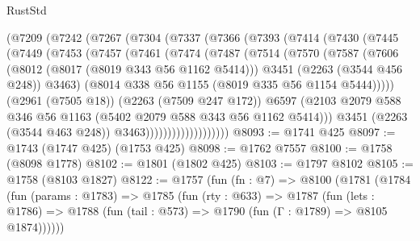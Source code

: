 \begin{lexlean}{RustStd}
\begin{coremodule}
{\begin{coremodule}
{{{{{{{{{{{{{{{            (@7209
              (@7242
                (@7267
                  (@7304
                    (@7337
                      (@7366
                        (@7393
                          (@7414
                            (@7430
                              (@7445
                                (@7449
                                  (@7453
                                    (@7457
                                      (@7461
                                        (@7474
                                          (@7487
                                            (@7514
                                              (@7570
                                                (@7587
                                                  (@7606
                                                    (@8012 (@8017 (@8019 @343 @56 @1162 @5414)))
                                                    @3451
                                                    (@2263 (@3544 @456 @248))
                                                    @3463)
                                                  (@8014
                                                    @338
                                                    @56
                                                    @1155
                                                    (@8019 @335 @56 @1154 @5444)))))
                                            (@2961 (@7505 @18))
                                            (@2263 (@7509 @247 @172))
                                            @6597
                                            (@2103
                                              @2079
                                              @588
                                              @346
                                              @56
                                              @1163
                                              (@5402 @2079 @588 @343 @56 @1162 @5414)))
                                          @3451
                                          (@2263 (@3544 @463 @248))
                                          @3463)))))))))))))))))))
@8093 := @1741 @425
@8097 := @1743 (@1747 @425) (@1753 @425)
@8098 := @1762 @7557
@8100 := @1758 (@8098 @1778)
@8102 := @1801 (@1802 @425)
@8103 := @1797 @8102
@8105 := @1758 (@8103 @1827)
@8122 := @1757
    (fun (fn : @7) =>
    @8100
      (@1781
        (@1784
          (fun (params : @1783) =>
          @1785
            (fun (rty : @633) =>
            @1787
              (fun (lets : @1786) =>
              @1788 (fun (tail : @573) => @1790 (fun (Γ : @1789) => @8105 @1874))))))
}}}}}}}}}}}}}}}
\end{coremodule}}
\end{coremodule}
\end{lexlean}

